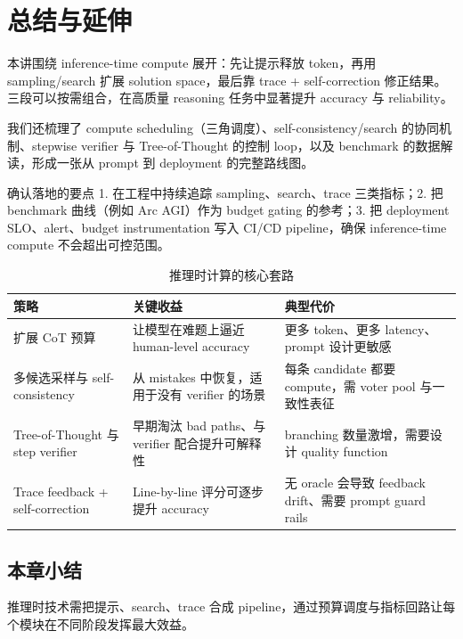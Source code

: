 \section{总结与延伸}
本讲围绕 inference-time compute 展开：先让提示释放 token，再用 sampling/search 扩展 solution space，最后靠 trace + self-correction 修正结果。三段可以按需组合，在高质量 reasoning 任务中显著提升 accuracy 与 reliability。

我们还梳理了 compute scheduling（三角调度）、self-consistency/search 的协同机制、stepwise verifier 与 Tree-of-Thought 的控制 loop，以及 benchmark 的数据解读，形成一张从 prompt 到 deployment 的完整路线图。

\begin{importantbox}{确认落地的要点}
1. 在工程中持续追踪 sampling、search、trace 三类指标；2. 把 benchmark 曲线（例如 Arc AGI）作为 budget gating 的参考；3. 把 deployment SLO、alert、budget instrumentation 写入 CI/CD pipeline，确保 inference-time compute 不会超出可控范围。
\end{importantbox}

\begin{table}[H]
\centering
\caption{推理时计算的核心套路}
\begin{tabular}{p{}p{}p{}}
\toprule
策略 & 关键收益 & 典型代价 \\
\midrule
扩展 CoT 预算 & 让模型在难题上逼近 human-level accuracy & 更多 token、更多 latency、prompt 设计更敏感 \\
多候选采样与 self-consistency & 从 mistakes 中恢复，适用于没有 verifier 的场景 & 每条 candidate 都要 compute，需 voter pool 与一致性表征 \\
Tree-of-Thought 与 step verifier & 早期淘汰 bad paths、与 verifier 配合提升可解释性 & branching 数量激增，需要设计 quality function \\
Trace feedback + self-correction & Line-by-line 评分可逐步提升 accuracy & 无 oracle 会导致 feedback drift、需要 prompt guard rails \\
\bottomrule
\end{tabular}
\end{table}

\subsection{本章小结}
推理时技术需把提示、search、trace 合成 pipeline，通过预算调度与指标回路让每个模块在不同阶段发挥最大效益。

